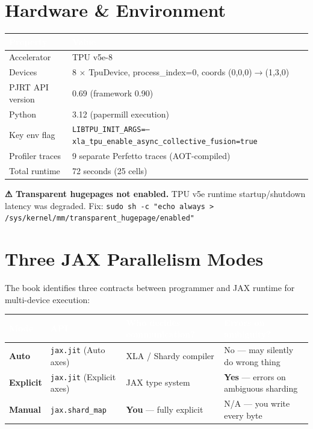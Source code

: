 \documentclass[11pt, a4paper]{article}
\newcommand{\codeinline}[1]{\texttt{\small\colorbox{accentbg}{\textcolor{accent}{#1}}}}
\newcommand{\thead}[1]{\textcolor{white}{\textbf{#1}}}
\newcommand{\roweven}{\rowcolor{rowlight}}
\begin{document}
\section{Hardware \& Environment}

\begin{center}
\begin{tabular}{l l l}
  \toprule
  \rowcolor{tablehead}
  \thead{Property} & \thead{Value} \\
  \midrule
  \roweven Accelerator & TPU v5e-8 \\
  Devices & 8 $\times$ TpuDevice, process\_index=0, coords (0,0,0)$\to$(1,3,0) \\
  \roweven PJRT API version & 0.69 (framework 0.90) \\
  Python & 3.12 (papermill execution) \\
  \roweven Key env flag & \codeinline{LIBTPU\_INIT\_ARGS=--xla\_tpu\_enable\_async\_collective\_fusion=true} \\
  Profiler traces & 9 separate Perfetto traces (AOT-compiled) \\
  \roweven Total runtime & 72 seconds (25 cells) \\
  \bottomrule
\end{tabular}
\end{center}

\begin{calloutwarning}
\textbf{⚠ Transparent hugepages not enabled.} TPU v5e runtime startup/shutdown latency was degraded.
Fix: \texttt{sudo sh -c "echo always > /sys/kernel/mm/transparent\_hugepage/enabled"}
\end{calloutwarning}

\section{Three JAX Parallelism Modes}

The book identifies three contracts between programmer and JAX runtime for multi-device execution:

\begin{center}
\begin{tabularx}{\linewidth}{L{2.8cm} L{3.5cm} L{4.5cm} L{2.8cm}}
  \toprule
  \thead{Mode} & \thead{API} & \thead{Who decides communication?} & \thead{Errors on ambiguity?} \\
  \midrule
  \roweven \textbf{Auto} & \codeinline{jax.jit} (Auto axes) & XLA / Shardy compiler & No --- may silently do wrong thing \\
  \textbf{Explicit} & \codeinline{jax.jit} (Explicit axes) & JAX type system & \textbf{Yes} --- errors on ambiguous sharding \\
  \roweven \textbf{Manual} & \codeinline{jax.shard\_map} & \textbf{You} --- fully explicit & N/A --- you write every byte \\
  \bottomrule
\end{tabularx}
\end{center}
\end{document}
